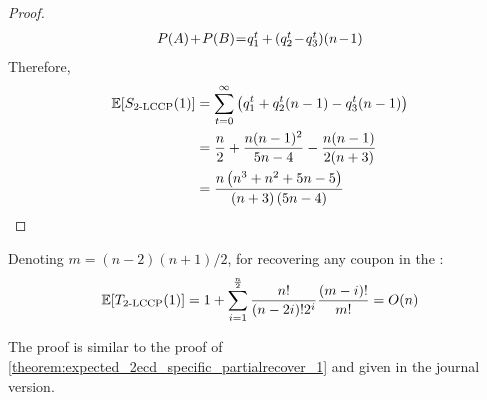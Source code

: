 \begin{proof}
\[\begin{array}{lcl}
    P(A) \hspace{-0.05cm}+\hspace{-0.05cm} P(B) 
    \hspace{-0.08cm}=\hspace{-0.08cm}
    q_1^t
    \hspace{-0.02cm}+\hspace{-0.02cm}
    (q_2 ^t
    \hspace{-0.05cm}-\hspace{-0.05cm}
    q_3 ^t)
    (n\hspace{-0.05cm}-\hspace{-0.05cm}1)
    \end{array}
    \]
    Therefore,
    \begin{align*}
    \E[\ST{\kecd{2}{n}}{1}] 
    &=
    \sum_{t=0}^{\infty}
    \left(
    q_1^t
    +
    q_2 ^t (n-1)
    -
    q_3 ^t (n-1)
    \right)
    \\&=
    \frac{n}{2}
    +
    \frac{n(n-1)^2}{5n-4}
    -
    \frac{n(n-1)}{2(n+3)}
    \\&=
    \frac{n \left(n^3 + n^2 + 5n - 5\right)}{\left(n + 3\right)\left(5n - 4\right)} 
     \vspace{-2ex}
    \end{align*}
     \vspace{-1.5ex}
\end{proof}
\begin{theorem}
\label{theorem:expected_2ecd_nonSpecific_partialrecovered_1}
Denoting $m = (n-2)(n+1)/2$, for recovering any coupon in the :
$$\E[\T{\kecd{2}{n}}{1}]  
        = 
        1
        +
        \sum_{i=1}^{\frac{n}{2}}
            \frac{n!}{(n-2i)! 2^i}
            \frac{\left(m- i\right)!}{m!}
        = 
        O(n)
            $$
\end{theorem}
The proof is similar to the proof of \autoref{theorem:expected_2ecd_specific_partialrecover_1}
and given in the journal version.
